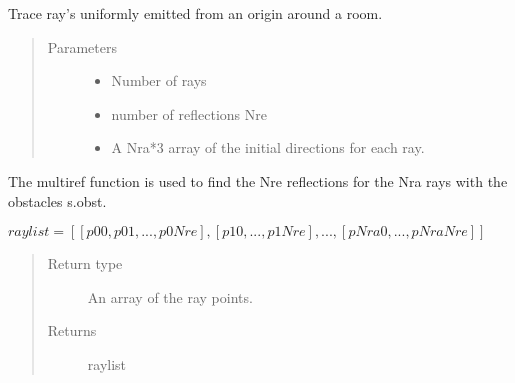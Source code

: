 \documentclass[letterpaper,10pt,english]{sphinxmanual}
\begin{document}
\begin{fulllineitems}
\begin{fulllineitems}
\begin{quote}
\begin{description}
\end{description}\end{quote}

\end{fulllineitems}


\begin{fulllineitems}
\label{\detokenize{index:Room.room.ray_bounce}}
Trace ray’s uniformly emitted from an origin around a room.
\begin{quote}\begin{description}
\item[{Parameters}] \leavevmode\begin{itemize}
\item {} 
 \textendash{} Number of rays

\item {} 
 \textendash{} number of reflections Nre

\item {} 
 \textendash{} A Nra*3 array of the initial directions     for each ray.

\end{itemize}

\end{description}\end{quote}

The multiref function is used to find the Nre reflections for     the Nra rays with the obstacles s.obst.

\(raylist=[[p00,p01,...,p0Nre],[p10,...,p1Nre],...,[pNra0,...,pNraNre]]\)
\begin{quote}\begin{description}
\item[{Return type}] \leavevmode
An array of the ray points.

\item[{Returns}] \leavevmode
raylist

\end{description}\end{quote}

\end{fulllineitems}



\end{fulllineitems}
\end{document}
